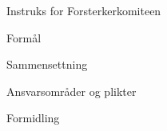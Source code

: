 \documentclass[../fsbok.tex]{subfiles}
\begin{document}
\begin{instruks}{Instruks for Forsterkerkomiteen}{}{}

    \begin{instruksledd}{Formål}
        \begin{enumerate}

        \end{enumerate}
        
    \end{instruksledd}

    \begin{instruksledd}{Sammensettning}
        \begin{enumerate}

        \end{enumerate}
    \end{instruksledd}

    \begin{instruksledd}{Ansvarsområder og plikter}
        \begin{enumerate}
                
        \end{enumerate}
    \end{instruksledd}

    \begin{instruksledd}{Formidling}
        \begin{enumerate}

        \end{enumerate}
    \end{instruksledd}


\end{instruks}
\end{document}
